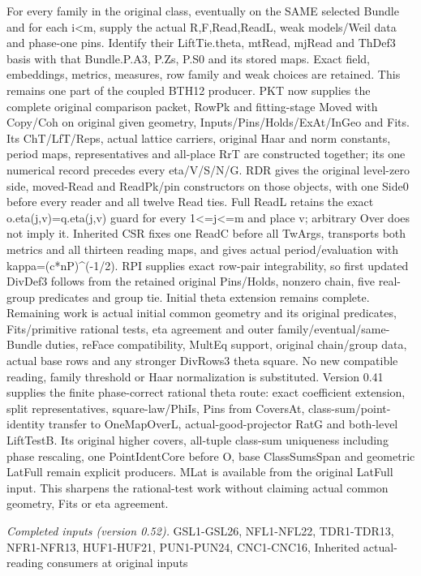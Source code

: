 For every family in the original class, eventually on the SAME selected Bundle and for each i<m, supply the actual R,F,Read,ReadL, weak models/Weil data and phase-one pins. Identify their LiftTie.theta, mtRead, mjRead and ThDef3 basis with that Bundle.P.A3, P.Zs, P.S0 and its stored maps. Exact field, embeddings, metrics, measures, row family and weak choices are retained. This remains one part of the coupled BTH12 producer. PKT now supplies the complete original comparison packet, RowPk and fitting-stage Moved with Copy/Coh on original given geometry, Inputs/Pins/Holds/ExAt/InGeo and Fits. Its ChT/LfT/Reps, actual lattice carriers, original Haar and norm constants, period maps, representatives and all-place RrT are constructed together; its one numerical record precedes every eta/V/S/N/G. RDR gives the original level-zero side, moved-Read and ReadPk/pin constructors on those objects, with one Side0 before every reader and all twelve Read ties. Full ReadL retains the exact o.eta(j,v)=q.eta(j,v) guard for every 1<=j<=m and place v; arbitrary Over does not imply it. Inherited CSR fixes one ReadC before all TwArgs, transports both metrics and all thirteen reading maps, and gives actual period/evaluation with kappa=(c*nP)\textasciicircum{}(-1/2). RPI supplies exact row-pair integrability, so first updated DivDef3 follows from the retained original Pins/Holds, nonzero chain, five real-group predicates and group tie. Initial theta extension remains complete. Remaining work is actual initial common geometry and its original predicates, Fits/primitive rational tests, eta agreement and outer family/eventual/same-Bundle duties, reFace compatibility, MultEq support, original chain/group data, actual base rows and any stronger DivRows3 theta square. No new compatible reading, family threshold or Haar normalization is substituted. Version 0.41 supplies the finite phase-correct rational theta route: exact coefficient extension, split representatives, square-law/PhiIs, Pins from CoversAt, class-sum/point-identity transfer to OneMapOverL, actual-good-projector RatG and both-level LiftTestB. Its original higher covers, all-tuple class-sum uniqueness including phase rescaling, one PointIdentCore before O, base ClassSumsSpan and geometric LatFull remain explicit producers. MLat is available from the original LatFull input. This sharpens the rational-test work without claiming actual common geometry, Fits or eta agreement.

\emph{Completed inputs (version 0.52).} GSL1-GSL26, NFL1-NFL22, TDR1-TDR13, NFR1-NFR13, HUF1-HUF21, PUN1-PUN24, CNC1-CNC16, Inherited actual-reading consumers at original inputs


